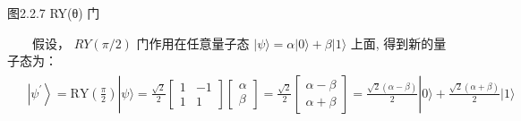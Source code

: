 \documentclass[a4paper,11pt,english]{sphinxmanual}
\begin{document}
\begin{center}图2.2.7 RY(θ) 门
\end{center}
\sphinxAtStartPar
  假设， \(RY(\pi / 2)\) 门作用在任意量子态  \(|\psi\rangle=\alpha|0\rangle+\beta|1\rangle\) 上面, 得到新的量子态为：
\begin{equation*}
\begin{split}\begin{aligned} &\left|\psi^{\prime}\right\rangle=\text{RY}\left(\frac{\pi}{2}\right)|\psi\rangle=\frac{\sqrt{2}}{2}\left[\begin{array}{cc} 1 & -1 \\ 1 & 1 \end{array}\right]\left[\begin{array}{l} \alpha \\ \beta \end{array}\right]=\frac{\sqrt{2}}{2}\left[\begin{array}{l} \alpha-\beta \\ \alpha+\beta \end{array}\right]=\frac{\sqrt{2}(\alpha-\beta)}{2}|0\rangle+\frac{\sqrt{2}(\alpha+\beta)}{2}|1\rangle \\ \end{aligned}\end{split}
\end{equation*}
\sphinxAtStartPar
{}
\end{document}
